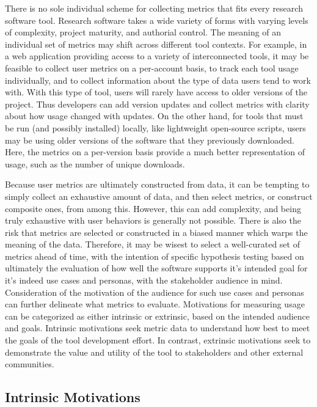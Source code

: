 \documentclass{article}
\begin{document}
There is no sole individual scheme for collecting metrics that fits every research software tool. Research software takes a wide variety of forms with varying levels of complexity, project maturity, and authorial control. The meaning of an individual set of metrics may shift across different tool contexts. For example, in a web application providing access to a variety of interconnected tools, it may be feasible to collect user metrics on a per-account basis, to track each tool usage individually, and to collect information about the type of data users tend to work with. With this type of tool, users will rarely have access to older versions of the project. Thus developers can add version updates and collect metrics with clarity about how usage changed with updates. On the other hand, for tools that must be run (and possibly installed)  locally, like lightweight open-source scripts, users may be using older versions of the software that they previously downloaded.  Here, the metrics on a per-version basis provide a much better representation of usage, such as the number of unique downloads. 

Because user metrics are ultimately constructed from data, it can be tempting to simply collect an exhaustive amount of data, and then select metrics, or construct composite ones, from among this. However, this can add complexity, and being truly exhaustive with user behaviors is generally not possible. There is also the risk that metrics are selected or constructed in a biased manner which warps the meaning of the data. Therefore, it may be wisest to select a well-curated set of metrics ahead of time, with the intention of specific hypothesis testing based on ultimately the evaluation of how well the software supports it’s intended goal for it’s indeed use cases and personas, with the stakeholder audience in mind. Consideration of the motivation of the audience for such use cases and personas can further delineate what metrics to evaluate. Motivations for measuring usage can be categorized as either intrinsic or extrinsic, based on the intended audience and goals. Intrinsic motivations seek metric data to understand how best to meet the goals of the tool development effort. In contrast, extrinsic motivations seek to demonstrate the value and utility of the tool to stakeholders and other external communities. 
\subsection{Intrinsic Motivations}
\end{document}
